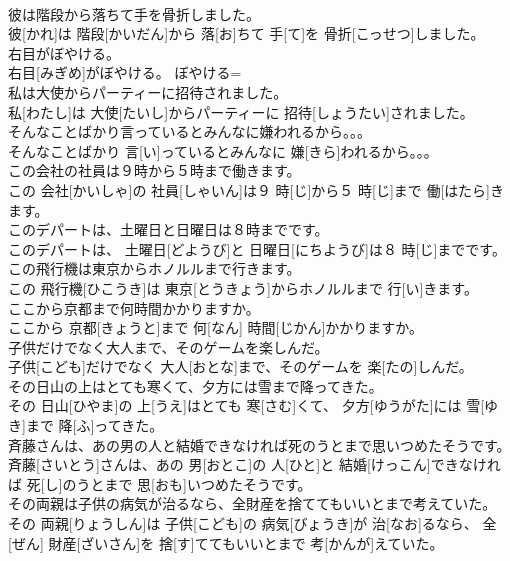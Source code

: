 \documentclass[8pt]{extreport}
\begin{document}
\begin{CJK}{UTF8}{min}
\\	彼は階段から落ちて手を骨折しました。	
\\	彼[かれ]は 階段[かいだん]から 落[お]ちて 手[て]を 骨折[こっせつ]しました。	
\\	右目がぼやける。	
\\	右目[みぎめ]がぼやける。	ぼやける= 
\\	私は大使からパーティーに招待されました。	
\\	私[わたし]は 大使[たいし]からパーティーに 招待[しょうたい]されました。	
\\	そんなことばかり言っているとみんなに嫌われるから。。。	
\\	そんなことばかり 言[い]っているとみんなに 嫌[きら]われるから。。。	
\\	この会社の社員は９時から５時まで働きます。	
\\	この 会社[かいしゃ]の 社員[しゃいん]は９ 時[じ]から５ 時[じ]まで 働[はたら]きます。	
\\	このデパートは、土曜日と日曜日は８時までです。	
\\	このデパートは、 土曜日[どようび]と 日曜日[にちようび]は８ 時[じ]までです。	
\\	この飛行機は東京からホノルルまで行きます。	
\\	この 飛行機[ひこうき]は 東京[とうきょう]からホノルルまで 行[い]きます。	
\\	ここから京都まで何時間かかりますか。	
\\	ここから 京都[きょうと]まで 何[なん] 時間[じかん]かかりますか。	
\\	子供だけでなく大人まで、そのゲームを楽しんだ。	
\\	子供[こども]だけでなく 大人[おとな]まで、そのゲームを 楽[たの]しんだ。	
\\	その日山の上はとても寒くて、夕方には雪まで降ってきた。	
\\	その 日山[ひやま]の 上[うえ]はとても 寒[さむ]くて、 夕方[ゆうがた]には 雪[ゆき]まで 降[ふ]ってきた。	
\\	斉藤さんは、あの男の人と結婚できなければ死のうとまで思いつめたそうです。	
\\	斉藤[さいとう]さんは、あの 男[おとこ]の 人[ひと]と 結婚[けっこん]できなければ 死[し]のうとまで 思[おも]いつめたそうです。	
\\	その両親は子供の病気が治るなら、全財産を捨ててもいいとまで考えていた。	
\\	その 両親[りょうしん]は 子供[こども]の 病気[びょうき]が 治[なお]るなら、 全[ぜん] 財産[ざいさん]を 捨[す]ててもいいとまで 考[かんが]えていた。	

\end{CJK}
\end{document}
